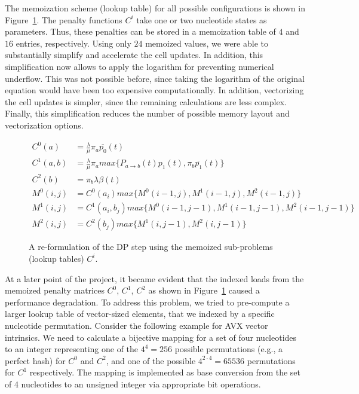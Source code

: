 \documentclass[runningheads,a4paper]{llncs}
\begin{document}
The memoization scheme (lookup table) for all possible configurations is shown in Figure~\ref{fig:memo}. 
The penalty functions $C^i$ take one or two nucleotide states as parameters.
Thus, these penalties can be stored in a memoization table of $4$ and $16$ entries, respectively. 
Using only $24$ memoized values, we were able to substantially simplify and accelerate the cell updates.
In addition, this simplification now allows to apply the logarithm for preventing numerical underflow.
This was not possible before, since taking the logarithm of the original equation would have been too expensive computationally. 
In addition, vectorizing the cell updates is simpler, since the remaining calculations are less complex. 
Finally, this simplification reduces the number of possible memory layout and vectorization options.

\begin{figure}
\[
\begin{aligned}
  C^0(a)&=\frac{\lambda}{\mu}\pi_{a}\overline{p_0}(t)\\
  C^1(a, b)&=\frac{\lambda}{\mu}\pi_{a}max\{P_{a \rightarrow b}(t) p_1(t), \pi_{b}\overline{p_1}(t)\}\\
  C^2(b)&=\pi_{b}\lambda\beta(t)\\
  M^0(i,j)&=C^0(a_i)max\{M^0(i-1, j), M^1(i-1,j), M^2(i-1,j)\}\\
  M^1(i,j)&=C^1(a_i,b_j)max\{M^0(i-1, j-1), M^1(i-1,j-1), M^2(i-1,j-1)\}\\
  M^2(i,j)&=C^2(b_j)max\{M^1(i,j-1), M^2(i,j-1)\}
\end{aligned}
\]
\caption{A re-formulation of the DP step using the memoized sub-problems (lookup tables) $C^i$.}
\label{fig:memo}
\end{figure}

At a later point of the project, it became evident that the indexed loads from the memoized penalty matrices $C^0$, $C^1$, $C^2$ as shown in Figure~\ref{fig:memo} 
caused a performance degradation. 
To address this problem, we tried to pre-compute a larger lookup table of vector-sized elements, that we indexed by a specific nucleotide permutation. 
Consider the following example for AVX vector intrinsics.
We need to calculate a bijective mapping for a set of four nucleotides to an integer representing one of the $4^4 = 256$ possible permutations (e.g., a perfect hash) 
for $C^0$ and $C^2$, and one of the possible $4^{2 \cdot 4} = 65536$ permutations for $C^1$ respectively. 
The mapping is implemented as base conversion from the set of 4 nucleotides to an unsigned integer via appropriate bit operations.
\end{document}
